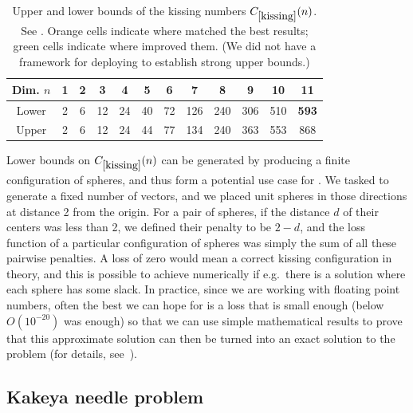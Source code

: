 \begin{table}[h]
\centering
\begin{tabular}{cccccccccccc}
\hline
Dim. $n$ & 1 & 2 & 3 & 4 & 5 & 6 & 7 & 8 & 9 & 10 & 11\\
\hline
Lower & \cellcolor{orange!30}2 & \cellcolor{orange!30}6 & \cellcolor{orange!30}12 & \cellcolor{orange!30}24 & \cellcolor{orange!30}40 & \cellcolor{orange!30}72 & \cellcolor{orange!30}126 & \cellcolor{orange!30}240 & \cellcolor{orange!30}306 & \cellcolor{orange!30}510  & \cellcolor{green!30}\textbf{593} \\
Upper & 2 & 6 & 12 & 24 & 44 & 77 & 134 & 240 & 363 & 553 & 868\\
\hline
\end{tabular}


\caption{Upper and lower bounds of the kissing numbers $C_{\ref{kissing}}(n)$. See \cite{cohn_kissing_table}.  Orange cells indicate where \AlphaEvolve matched the best results; green cells indicate where \AlphaEvolve improved them.  (We did not have a framework for deploying \AlphaEvolve to establish strong upper bounds.)}
\label{table:kissing}
\end{table}

Lower bounds on $C_{\ref{kissing}}(n)$ can be generated by producing a finite configuration of spheres, and thus form a potential use case for \AlphaEvolve. We tasked \AlphaEvolve to generate a fixed number of vectors, and we placed unit spheres in those directions at distance 2 from the origin. For a pair of spheres, if the distance $d$ of their centers was less than 2, we defined their penalty to be $2-d$, and the loss function of a particular configuration of spheres was simply the sum of all these pairwise penalties. A loss of zero would mean a correct kissing configuration in theory, and this is possible to achieve numerically if e.g.~there is a solution where each sphere has some slack. In practice, since we are working with floating point numbers, often the best we can hope for is a loss that is small enough (below $O(10^{-20})$ was enough) so that we can use simple mathematical results to prove that this approximate solution can then be turned into an exact solution to the problem (for details, see~\cite{novikov2025alphaevolve, AEcolab}).


\subsection{Kakeya needle problem} 

\renewcommand{\problemURL}{https://google-deepmind.github.io/alphaevolve_repository_of_problems/problems/9.html}

